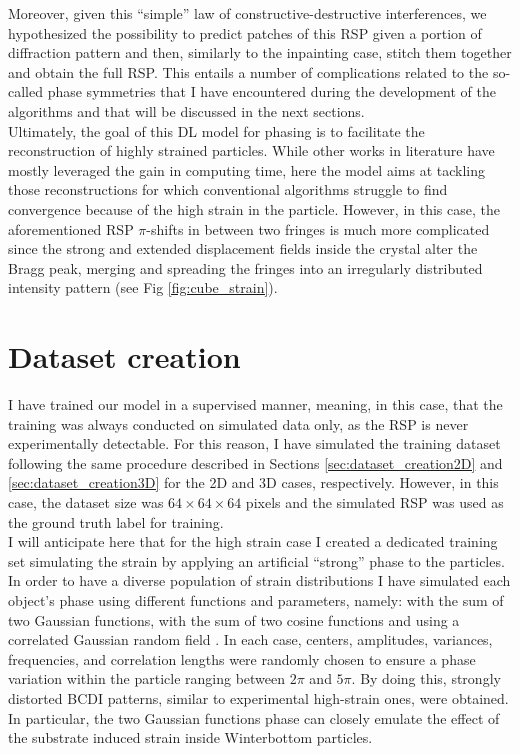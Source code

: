 Moreover, given this ``simple'' law of constructive-destructive interferences, we hypothesized the possibility to predict patches 
of this RSP given a portion of diffraction pattern and then, similarly to the inpainting case, stitch them together
and obtain the full RSP. This entails a number of complications related to the so-called phase symmetries that I have encountered
during the development of the algorithms and that will be discussed in the next sections. \\
Ultimately, the goal of this DL model for phasing is to facilitate the reconstruction of highly strained particles. While 
other works in literature have mostly leveraged the gain in computing time, here the model aims at tackling those reconstructions for which 
conventional algorithms struggle to find convergence because of the high strain in the particle.   
However, in this case, the aforementioned RSP $\pi$-shifts in between two fringes is much more complicated since the 
strong and extended displacement fields inside the crystal alter the Bragg peak, merging and spreading the fringes 
into an irregularly distributed intensity pattern (see Fig \ref{fig:cube_strain}).

\section{Dataset creation} 

I have trained our model in a supervised manner, meaning, in this case, that the training was always conducted on simulated data 
only, as the RSP is never experimentally detectable. 
For this reason, I have simulated the training dataset following the same procedure described in Sections 
\ref{sec:dataset_creation2D} and \ref{sec:dataset_creation3D} for the 2D and 3D cases, respectively. However, in this
case, the dataset size was $64\times64\times64$ pixels and the simulated RSP was used as the ground truth label for training.\\

I will anticipate here that for the high strain case I created a dedicated training set simulating the strain by applying 
an artificial ``strong'' phase to the particles. In order to have a diverse population of strain distributions I have 
simulated each object's phase using different functions and parameters, namely: with the sum of two Gaussian functions,
with the sum of two cosine functions and using a correlated Gaussian random field \cite{Gaussian_noise1984}. In each 
case, centers, amplitudes, variances, frequencies, and correlation lengths were randomly chosen to ensure a phase 
variation within the particle ranging between 
$2\pi$ and $5\pi$. By doing this, strongly distorted BCDI patterns, similar to experimental high-strain ones, were obtained. 
In particular, the two Gaussian functions phase can closely emulate the effect of the substrate induced strain inside 
Winterbottom particles. 


